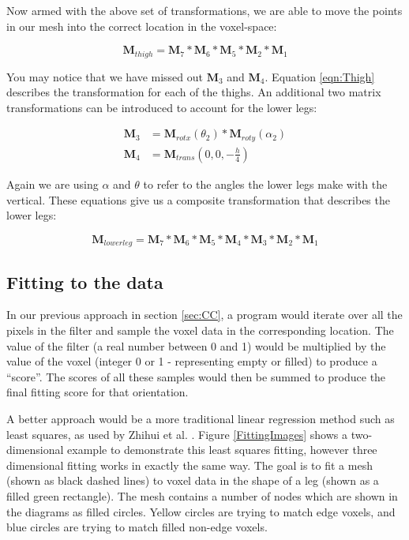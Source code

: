 Now armed with the above set of transformations, we are able to move the points in our mesh into the correct location in the voxel-space:

\begin{equation}
	\label{eqn:Thigh} \mathbf{M}_{thigh} = \mathbf{M}_{7} * \mathbf{M}_{6} * \mathbf{M}_{5} * \mathbf{M}_{2} * \mathbf{M}_{1}
\end{equation}

You may notice that we have missed out $\mathbf{M}_{3}$ and $\mathbf{M}_{4}$.
Equation \ref{eqn:Thigh} describes the transformation for each of the thighs.
An additional two matrix transformations can be introduced to account for the lower legs:

\begin{align}
	\mathbf{M}_{3} &= \mathbf{M}_{rotx}(\theta_{2}) * \mathbf{M}_{roty}(\alpha_{2}) \\
	\mathbf{M}_{4} &= \mathbf{M}_{trans}\left( 0, 0, -\frac{h}{4}\right)
\end{align}

Again we are using $\alpha$ and $\theta$ to refer to the angles the lower legs make with the vertical.
These equations give us a composite transformation that describes the lower legs:

\begin{equation}
	\label{eqn:LowerLegs} \mathbf{M}_{lowerleg} = \mathbf{M}_{7} * \mathbf{M}_{6} * \mathbf{M}_{5} * \mathbf{M}_{4} * \mathbf{M}_{3} * \mathbf{M}_{2} * \mathbf{M}_{1}
\end{equation}



\subsection{Fitting to the data}

In our previous approach in section \ref{sec:CC}, a program would iterate over all the pixels in the filter and sample the
voxel data in the corresponding location.
The value of the filter (a real number between 0 and 1) would be multiplied by the value of the voxel (integer 0 or 1 - representing empty or filled) to produce a ``score''.
The scores of all these samples would then be summed to produce the final fitting score for that orientation.

A better approach would be a more traditional linear regression method such as least squares, as used by Zhihui et al. \cite{LinearModelFitting}.
Figure \ref{FittingImages} shows a two-dimensional example to demonstrate this least squares fitting, however three dimensional fitting works in exactly the same way.
The goal is to fit a mesh (shown as black dashed lines) to voxel data in the shape of a leg (shown as a filled green rectangle).
The mesh contains a number of nodes which are shown in the diagrams as filled circles.
Yellow circles are trying to match edge voxels, and blue circles are trying to match filled non-edge voxels.

